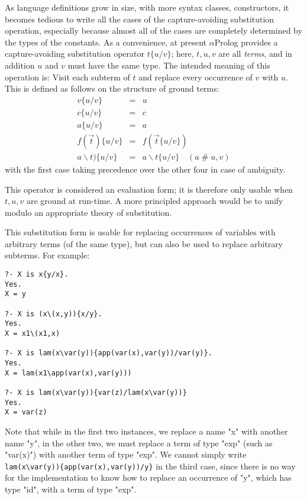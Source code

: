 \documentclass[draft,12pt]{report}
\newcommand{\aprolog}{$\alpha${Prolog}\xspace}
\newcommand{\fresh}{\mathrel\#}
\newcommand{\abs}{\backslash}
\begin{document}
As language definitions grow in size, with more syntax classes, constructors,
it becomes tedious to write all the cases of the capture-avoiding substitution operation, especially because almost all of the cases are completely determined by the types of the constants.  As a convenience, at present \aprolog provides a capture-avoiding substitution operator $t\{u/v\}$; here, $t,u,v$ are all \emph{terms}, and in addition $u$ and $v$ must have the same type.  The intended meaning of this operation is:  Visit each subterm of $t$ and replace every occurrence of $v$ with $u$.  This is defined as follows on the structure of ground terms:
\begin{eqnarray*}
  v\{u/v\} &=& u\\
  c\{u/v\} &=& c\\
  a\{u/v\} &=& a\\
  f(\vec{t})\{u/v\} &=& f(\vec{t}\{u/v\})\\
  {a}\abs{t})\{u/v\} &=& {a}\abs{t\{u/v\}} \quad (a \fresh u,v)
\end{eqnarray*}
with the first case taking precedence over the other four in case of ambiguity.

This operator is considered an evaluation form; it is therefore only usable when $t,u,v$ are ground at run-time.  A more principled approach would be to unify modulo an appropriate theory of substitution.

This substitution form is usable for replacing occurrences of variables with arbitrary terms (of the same type), but can also be used to replace arbitrary subterms.  For example:

\begin{verbatim}
?- X is x{y/x}.
Yes.
X = y

?- X is (x\(x,y)){x/y}.
Yes.
X = x1\(x1,x)

?- X is lam(x\var(y)){app(var(x),var(y))/var(y)}.
Yes. 
X = lam(x1\app(var(x),var(y)))

?- X is lam(x\var(y)){var(z)/lam(x\var(y))}
Yes.
X = var(z)
\end{verbatim}

Note that while in the first two instances, we replace a name "x" with another name "y", in the other two, we must replace a term of type "exp" (such as "var(x)") with another term of type "exp".  We cannot simply write \verb|lam(x\var(y)){app(var(x),var(y))/y}| in the third case, since there is no way for the implementation to know how to replace an occurrence of "y", which has type "id", with a term of type "exp".
\end{document}
